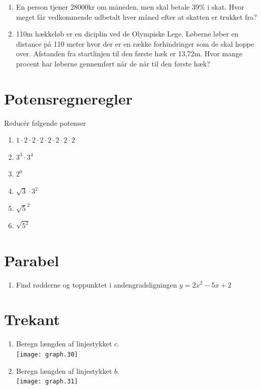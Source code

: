 \documentclass[11pt,a5paper,fleqn,leqno]{book}
\begin{document}
\begin{enumerate}
\item \label{op:procent_1} En person tjener 28000kr om måneden, men skal betale 39\% i skat. Hvor meget får vedkommende udbetalt hver måned efter at skatten er trukket fra?
\item \label{op:procent_2} 110m hækkeløb er en diciplin ved de Olympiske Lege. Løberne løber en distance på 110 meter hvor der er en række forhindringer som de skal hoppe over. Afstanden fra startlinjen til den første hæk er 13,72m. Hvor mange procent har løberne gennemført når de når til den første hæk?
\end{enumerate}

\section{Potensregneregler}

Reducér følgende potenser

\begin{enumerate}
\item \label{op:potens_1} $1 \cdot 2 \cdot 2 \cdot 2 \cdot 2 \cdot 2 \cdot 2 \cdot 2$
\item \label{op:potens_2} $3^3 \cdot 3^4$
\item \label{op:potens_3} $2^0$
\item \label{op:potens_4} $\sqrt{3} \cdot 3^2$
\item \label{op:potens_5} $\sqrt{5}^2$
\item \label{op:potens_6} $\sqrt{5^2}$
\end{enumerate}

\section{Parabel}

\begin{enumerate}
\item \label{op:parabel_1} Find rødderne og toppunktet i andengradsligningen $y = 2x^2 - 5x + 2$
\end{enumerate}

\section{Trekant}

\begin{enumerate}
\item \label{op:trekant_1}
Beregn længden af linjestykket $c$. \\
\texttt{[image: graph.30]}
\item \label{op:trekant_2}
Beregn længden af linjestykket $b$. \\
\texttt{[image: graph.31]}
\end{enumerate}
\end{document}
